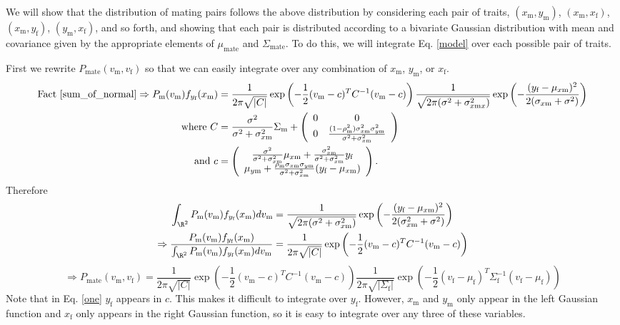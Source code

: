 \documentclass{article}
\newcommand{\x}[1]{\text{#1}}
\begin{document}
\begin{pf}
We will show that the distribution of mating pairs follows the above distribution by considering each pair of traits, $(x_\x{m},y_\x{m})$, $(x_\x{m},x_\x{f})$, $(x_\x{m},y_\x{f})$, $(y_\x{m},x_\x{f})$, and so forth, and showing that each pair is distributed according to a bivariate Gaussian distribution with mean and covariance given by the appropriate elements of $\mu_\text{mate}$ and $\Sigma_\text{mate}$. To do this, we will integrate Eq. \ref{model} over each possible pair of traits.

First we rewrite $P_\x{mate}(v_\x{m},v_\x{f})$ so that we can easily integrate over any combination of $x_\x{m}$, $y_\x{m}$, or $x_\x{f}$.
\begin{align}
\text{Fact \ref{sum_of_normal}} \Rightarrow P_\x{m}(v_\x{m})f_{y_\x{f}}(x_\x{m})&=\frac{1}{2\pi\sqrt{|C|}}\exp\left(-\frac{1}{2}(v_\x{m}-c)^TC^{-1}(v_\x{m}-c)\right)\frac{1}{\sqrt{2\pi(\sigma^2+\sigma_{x\x{m}x}^2)}}\exp\left(-\frac{(y_\x{f}-\mu_{x\x{m}})^2}{2(\sigma_{x\x{m}}+\sigma^2)}\right) \notag
\\ \text{ where } C&=\frac{\sigma^2}{\sigma^2+\sigma_{x\x{m}}^2}\Sigma_\x{m}+\left(\begin{array}{cc} 0 & 0 \\ 0 & \frac{(1-\rho_\x{m}^2)\sigma_{x\x{m}}^2\sigma_{y\x{m}}^2}{\sigma^2+\sigma_{x\x{m}}^2}\end{array}\right)  \label{C}
\\ \text{ and } c&= \left(\begin{array}{cc}\frac{\sigma^2}{\sigma^2+\sigma_{x\x{m}}^2}\mu_{x\x{m}}+\frac{\sigma_{x\x{m}}^2}{\sigma^2+\sigma_{x\x{m}}^2}y_\x{f}  
\\ \mu_{y\x{m}}+\frac{\rho_\x{m}\sigma_{x\x{m}}\sigma_{y\x{m}}}{\sigma^2+\sigma_{x\x{m}}^2}(y_\x{f}-\mu_{x\x{m}}) \end{array}\right).  \notag
\end{align}
Therefore 
\begin{align}
\int_{\R^2}P_\x{m}(v_\x{m})f_{y_\x{f}}(x_\x{m})dv_\x{m}&=\frac{1}{\sqrt{2\pi(\sigma^2+\sigma_{x\x{m}}^2)}}\exp\left(-\frac{(y_\x{f}-\mu_{x\x{m}})^2}{2(\sigma_{x\x{m}}^2+\sigma^2)}\right) \label{Z}
\\ \Rightarrow \frac{P_\x{m}(v_\x{m})f_{y_\x{f}}(x_\x{m})}{\int_{\R^2} P_\x{m}(v_\x{m})f_{y_\x{f}}(x_\x{m})dv_\x{m} }&=\frac{1}{2\pi\sqrt{|C|}}\exp\left(-\frac{1}{2}(v_\x{m}-c)^TC^{-1}(v_\x{m}-c)\right) \notag
\end{align}
\begin{equation} \label{one}
\Rightarrow P_\x{mate}(v_\x{m},v_\x{f})=\frac{1}{2\pi\sqrt{|C|}}\exp\left(-\frac{1}{2}(v_\x{m}-c)^TC^{-1}(v_\x{m}-c)\right)\frac{1}{2\pi\sqrt{|\Sigma_\x{f}|}}\exp\left(-\frac{1}{2}(v_\x{f}-\mu_\x{f})^T\Sigma_\x{f}^{-1}(v_\x{f}-\mu_\x{f})\right)
\end{equation}
Note that in Eq. \ref{one} $y_\x{f}$ appears in $c$. This makes it difficult to integrate over $y_\x{f}$. However, $x_\x{m}$ and $y_\x{m}$ only appear in the left Gaussian function and $x_\x{f}$ only appears in the right Gaussian function, so it is easy to integrate over any three of these variables.


\end{pf}
\end{document}
